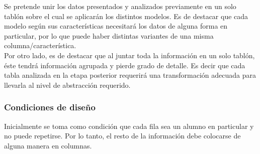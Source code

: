 Se pretende unir los datos presentados y analizados previamente en un solo tablón sobre el cual se aplicarán los distintos modelos. Es de destacar que cada modelo según sus características necesitará los datos de alguna forma en particular, por lo que puede haber distintas variantes de una misma columna/característica. \\
Por otro lado, es de destacar que al juntar toda la información en un solo tablón, éste tendrá información agrupada y pierde grado de detalle. Es decir que cada tabla analizada en la etapa posterior requerirá una transformación adecuada para llevarla al nivel de abstracción requerido.\\
\subsubsection{Condiciones de diseño}
Inicialmente se toma como condición que cada fila sea un alumno en particular y no puede repetirse. Por lo tanto, el resto de la información debe colocarse de alguna manera en columnas.
